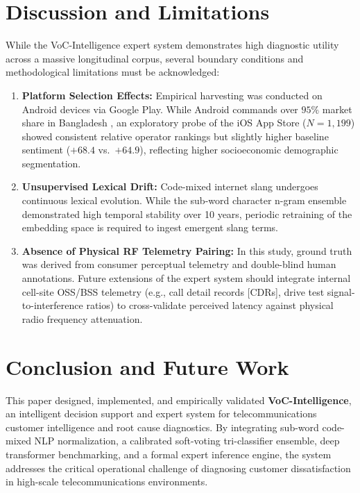 \documentclass[5p,twocolumn,authoryear]{elsarticle}
\begin{document}
\section{Discussion and Limitations}
\label{sec:limitations}

While the VoC-Intelligence expert system demonstrates high diagnostic utility across a massive longitudinal corpus, several boundary conditions and methodological limitations must be acknowledged:
\begin{enumerate}
    \item \textbf{Platform Selection Effects:} Empirical harvesting was conducted on Android devices via Google Play. While Android commands over $95\%$ market share in Bangladesh \citep{btrc2026quarterly}, an exploratory probe of the iOS App Store ($N = 1{,}199$) showed consistent relative operator rankings but slightly higher baseline sentiment ($+68.4$ vs.\ $+64.9$), reflecting higher socioeconomic demographic segmentation.
    \item \textbf{Unsupervised Lexical Drift:} Code-mixed internet slang undergoes continuous lexical evolution. While the sub-word character n-gram ensemble demonstrated high temporal stability over 10 years, periodic retraining of the embedding space is required to ingest emergent slang terms.
    \item \textbf{Absence of Physical RF Telemetry Pairing:} In this study, ground truth was derived from consumer perceptual telemetry and double-blind human annotations. Future extensions of the expert system should integrate internal cell-site OSS/BSS telemetry (e.g., call detail records [CDRs], drive test signal-to-interference ratios) to cross-validate perceived latency against physical radio frequency attenuation.
\end{enumerate}

\section{Conclusion and Future Work}
\label{sec:conclusion}

This paper designed, implemented, and empirically validated \textbf{VoC-Intelligence}, an intelligent decision support and expert system for telecommunications customer intelligence and root cause diagnostics. By integrating sub-word code-mixed NLP normalization, a calibrated soft-voting tri-classifier ensemble, deep transformer benchmarking, and a formal expert inference engine, the system addresses the critical operational challenge of diagnosing customer dissatisfaction in high-scale telecommunications environments.
\end{document}
